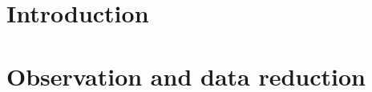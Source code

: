 \documentclass[linenumbers, twocolumn, twocolappendix, astrosymb, times]{aastex631}
\begin{document}

\section{Introduction} \label{sec:intro}

\section{Observation and data reduction} \label{sec:observation}
\end{document}
